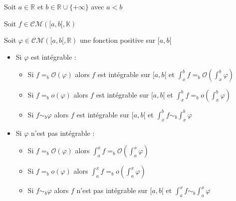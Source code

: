\documentclass[a4paper,12pt]{book}
\newcommand{\Thr}[2]{\begin{tcolorbox}[sharp corners, colback=white,colframe=red!10!blue!30!green!75!, title=Théorème : #1]#2\end{tcolorbox}}
\def\R{\mathbb{R}}
\def\K{\mathbb{K}}
\begin{document}
\Thr{Intégration des ordres de grandeur}{Soit $a\in\R$ et $b\in\R\cup\{+\infty\}$ avec $a<b$ \par Soit $f\in\mathcal{CM}([a,b[,\K)$ \par Soit $\varphi\in\mathcal{CM}([a,b[,\R)$ une fonction positive sur $[a,b[$\begin{itemize}
\item Si $\varphi$ est intégrable :\begin{itemize}
	\item Si $f=_b\mathcal{O}(\varphi)$ alors $f$ est intégrable sur $[a,b[$ et $\int_x^bf=_b\mathcal{O}(\int_x^b\varphi)$
	\item Si $f=_bo(\varphi)$ alors $f$ est intégrable sur $[a,b[$ et $\int_x^bf=_bo(\int_x^b\varphi)$
	\item Si $f\sim_b\varphi$ alors $f$ est intégrable sur $[a,b[$ et $\int_x^bf\sim_b\int_x^b\varphi$
\end{itemize}
\item Si $\varphi$ n'est pas intégrable :\begin{itemize}
	\item Si $f=_b\mathcal{O}(\varphi)$ alors $\int_a^xf=_b\mathcal{O}(\int_a^x\varphi)$
	\item Si $f=_bo(\varphi)$ alors $\int_a^xf=_bo(\int_a^x\varphi)$
	\item Si $f\sim_b\varphi$ alors $f$ n'est pas intégrable sur $[a,b[$ et $\int_a^xf\sim_b\int_a^x\varphi$
\end{itemize}
\end{itemize}}
\end{document}
